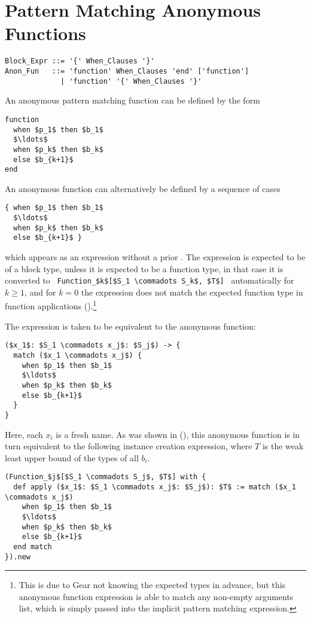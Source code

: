 \section{Pattern Matching Anonymous Functions}
\label{sec:pattern-matching-anon-fun}

\syntax\begin{lstlisting}
Block_Expr ::= '{' When_Clauses '}'
Anon_Fun   ::= 'function' When_Clauses 'end' ['function']
             | 'function' '{' When_Clauses '}'
\end{lstlisting}

An anonymous pattern matching function can be defined by the form
\begin{lstlisting}
function 
  when $p_1$ then $b_1$ 
  $\ldots$ 
  when $p_k$ then $b_k$ 
  else $b_{k+1}$
end
\end{lstlisting}

An anonymous function can alternatively be defined by a sequence of cases
\begin{lstlisting}
{ when $p_1$ then $b_1$ 
  $\ldots$ 
  when $p_k$ then $b_k$ 
  else $b_{k+1}$ }
\end{lstlisting}
which appears as an expression without a prior . The expression is expected to be of a block type, unless it is expected to be a function type, in that case it is converted to ~\lstinline!Function_$k$[$S_1 \commadots S_k$, $T$]!~ automatically for $k \geq 1$, and for $k = 0$ the expression does not match the expected function type in function applications ().\footnote{This is due to Gear not knowing the expected types in advance, but this anonymous function expression is able to match any non-empty arguments list, which is simply passed into the implicit pattern matching expression.} 

The expression is taken to be equivalent to the anonymous function:
\begin{lstlisting}
($x_1$: $S_1 \commadots x_j$: $S_j$) -> {
  match ($x_1 \commadots x_j$) {
    when $p_1$ then $b_1$
    $\ldots$
    when $p_k$ then $b_k$
    else $b_{k+1}$
  }
}
\end{lstlisting}

Here, each $x_i$ is a fresh name. As was shown in (), this anonymous function is in turn equivalent to the following instance creation expression, where $T$ is the weak least upper bound of the types of all $b_i$. 

\begin{lstlisting}
(Function_$j$[$S_1 \commadots S_j$, $T$] with {
  def apply ($x_1$: $S_1 \commadots x_j$: $S_j$): $T$ := match ($x_1 \commadots x_j$)
    when $p_1$ then $b_1$
    $\ldots$
    when $p_k$ then $b_k$
    else $b_{k+1}$
  end match
}).new
\end{lstlisting}

